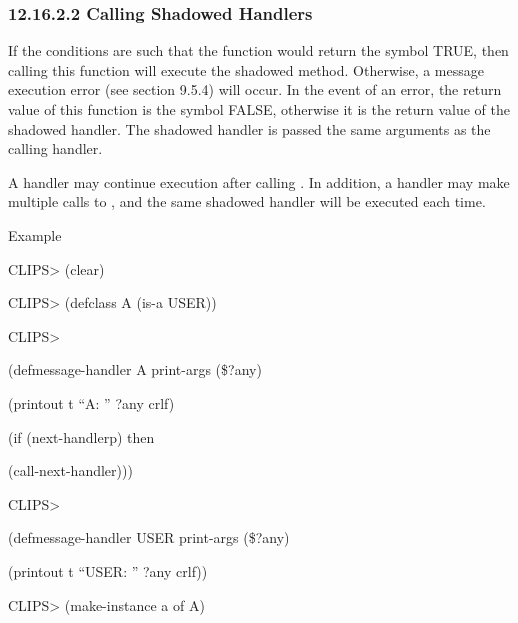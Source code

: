 \documentclass[letterpaper,10pt,english]{sphinxmanual}
\begin{document}

\begin{sphinxVerbatim}[commandchars=\\\{\}]
\end{sphinxVerbatim}


\subsubsection{12.16.2.2 Calling Shadowed Handlers}
\label{\detokenize{actions:calling-shadowed-handlers}}
If the conditions are such that the function  would
return the symbol TRUE, then calling this function will execute the
shadowed method. Otherwise, a message execution error (see section
9.5.4) will occur. In the event of an error, the return value of this
function is the symbol FALSE, otherwise it is the return value of the
shadowed handler. The shadowed handler is passed the same arguments as
the calling handler.

A handler may continue execution after calling . In
addition, a handler may make multiple calls to ,
and the same shadowed handler will be executed each time.


\begin{sphinxVerbatim}[commandchars=\\\{\}]
\end{sphinxVerbatim}

Example

CLIPS\textgreater{} (clear)

CLIPS\textgreater{} (defclass A (is-a USER))

CLIPS\textgreater{}

(defmessage-handler A print-args (\$?any)

(printout t “A: ” ?any crlf)

(if (next-handlerp) then

(call-next-handler)))

CLIPS\textgreater{}

(defmessage-handler USER print-args (\$?any)

(printout t “USER: ” ?any crlf))

CLIPS\textgreater{} (make-instance a of A)
\end{document}
